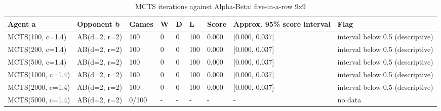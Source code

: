 \begin{table}[!t]
\centering
\caption{MCTS iterations against Alpha-Beta: five-in-a-row 9x9}
\label{tab:ab_ladder_gomoku9}
\small
\begin{tabular}{lllllllll}
\toprule
Agent a & Opponent b & Games & W & D & L & Score & Approx. 95\% score interval & Flag \\
\midrule
MCTS(100, c=1.4) & AB(d=2, r=2) & 100 & 0 & 0 & 100 & 0.000 & [0.000, 0.037] & interval below 0.5 (descriptive) \\
MCTS(200, c=1.4) & AB(d=2, r=2) & 100 & 0 & 0 & 100 & 0.000 & [0.000, 0.037] & interval below 0.5 (descriptive) \\
MCTS(500, c=1.4) & AB(d=2, r=2) & 100 & 0 & 0 & 100 & 0.000 & [0.000, 0.037] & interval below 0.5 (descriptive) \\
MCTS(1000, c=1.4) & AB(d=2, r=2) & 100 & 0 & 0 & 100 & 0.000 & [0.000, 0.037] & interval below 0.5 (descriptive) \\
MCTS(2000, c=1.4) & AB(d=2, r=2) & 100 & 0 & 0 & 100 & 0.000 & [0.000, 0.037] & interval below 0.5 (descriptive) \\
MCTS(5000, c=1.4) & AB(d=2, r=2) & 0/100 & - & - & - & - & - & no data \\
\bottomrule
\end{tabular}
\end{table}
